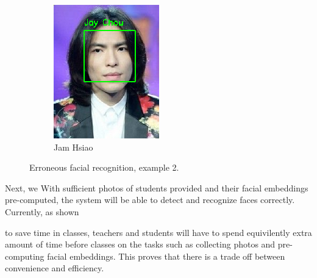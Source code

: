 \begin{figure}[!htb]
\begin{subfigure}[b]{0.3\linewidth}
    \includegraphics[width=\linewidth]{figures/false-recog-error2.png}
    \caption{Jam Hsiao}
  \end{subfigure}
  \caption{Erroneous facial recognition, example 2.}
  \label{fig:false-recog2}
\end{figure}
\vspace{0.5cm}


Next, we
With sufficient photos of students provided and their facial embeddings pre-computed,
the system will be able to detect and recognize faces correctly. Currently, as shown

to save time in classes, teachers and students will have to spend equivilently extra amount of time
before classes on the tasks such as collecting photos and pre-computing facial embeddings.
This proves that there is a trade off between convenience and efficiency.
\vspace{0.2cm}


